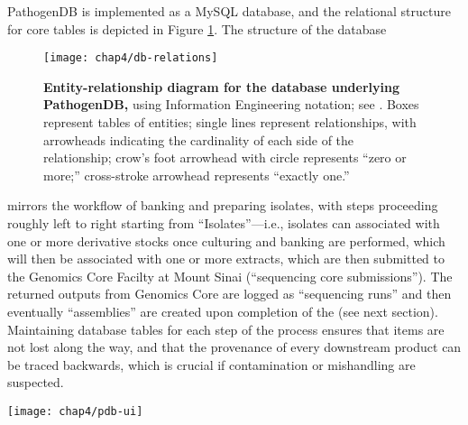 PathogenDB is implemented as a MySQL database, and the relational structure for core tables is depicted in Figure \ref{fig:pdb_relations}. The structure of the database 
\begin{figure}[htb]
  \texttt{[image: chap4/db-relations]}               
  \caption[Entity-relationship diagram for the database underlying Pa\-tho\-gen\-DB]{\textbf{Entity-relationship diagram for the database underlying PathogenDB,} using Information Engineering notation; see \textcite{Halpin2010}. Boxes represent tables of entities; single lines represent relationships, with arrowheads indicating the cardinality of each side of the relationship; crow’s foot arrowhead with circle represents “zero or more;” cross-stroke arrowhead represents “exactly one.”}
  \label{fig:pdb_relations}
\end{figure}
mirrors the workflow of banking and preparing isolates, with steps proceeding roughly left to right starting from ``Isolates''—i.e., isolates can associated with one or more derivative stocks once culturing and banking are performed, which will then be associated with one or more extracts, which are then submitted to the Genomics Core Facilty at Mount Sinai (``sequencing core submissions''). The returned outputs from Genomics Core are logged as ``sequencing runs'' and then eventually ``assemblies'' are created upon completion of the \pathogendbpipeline{} (see next section). Maintaining database tables for each step of the process ensures that items are not lost along the way, and that the provenance of every downstream product can be traced backwards, which is crucial if contamination or mishandling are suspected.

\begin{sidewaysfigure}[hp]
  \sidewaysvspace
  \centering
  \texttt{[image: chap4/pdb-ui]}               
\end{sidewaysfigure}


